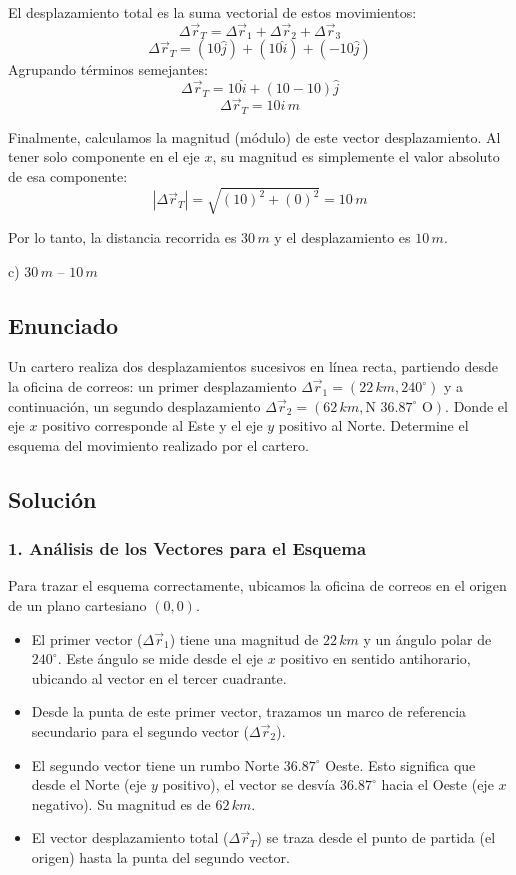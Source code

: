 \documentclass[12pt, a4paper]{article}
\begin{document}
El desplazamiento total es la suma vectorial de estos movimientos:
$$\Delta\vec{r}_T = \Delta\vec{r}_1 + \Delta\vec{r}_2 + \Delta\vec{r}_3$$
$$\Delta\vec{r}_T = (10\hat{j}) + (10\hat{i}) + (-10\hat{j})$$
Agrupando términos semejantes:
$$\Delta\vec{r}_T = 10\hat{i} + (10 - 10)\hat{j}$$
$$\Delta\vec{r}_T = 10\hat{i} \, \si{m}$$

Finalmente, calculamos la magnitud (módulo) de este vector desplazamiento. Al tener solo componente en el eje $x$, su magnitud es simplemente el valor absoluto de esa componente:
$$|\Delta\vec{r}_T| = \sqrt{(10)^2 + (0)^2} = 10 \, \si{m}$$

Por lo tanto, la distancia recorrida es $30 \, \si{m}$ y el desplazamiento es $10 \, \si{m}$.

\begin{tcolorbox}[colback=green!5!white, colframe=green!50!black, title=Respuesta Final]
\centering \Large c) $30 \, \si{m}$ -- $10 \, \si{m}$
\end{tcolorbox}

\newpage

\subsection*{Enunciado}
Un cartero realiza dos desplazamientos sucesivos en línea recta, partiendo desde la oficina de correos: un primer desplazamiento $\Delta\vec{r}_1 = (22 \, \si{km}, 240^\circ)$ y a continuación, un segundo desplazamiento $\Delta\vec{r}_2 = (62 \, \si{km}, \text{N } 36.87^\circ \text{ O})$. Donde el eje $x$ positivo corresponde al Este y el eje $y$ positivo al Norte. Determine el esquema del movimiento realizado por el cartero.

\subsection*{Solución}

\subsubsection*{1. Análisis de los Vectores para el Esquema}
Para trazar el esquema correctamente, ubicamos la oficina de correos en el origen de un plano cartesiano $(0,0)$. 
\begin{itemize}
    \item El primer vector ($\Delta\vec{r}_1$) tiene una magnitud de $22 \, \si{km}$ y un ángulo polar de $240^\circ$. Este ángulo se mide desde el eje $x$ positivo en sentido antihorario, ubicando al vector en el tercer cuadrante.
    \item Desde la punta de este primer vector, trazamos un marco de referencia secundario para el segundo vector ($\Delta\vec{r}_2$).
    \item El segundo vector tiene un rumbo Norte $36.87^\circ$ Oeste. Esto significa que desde el Norte (eje $y$ positivo), el vector se desvía $36.87^\circ$ hacia el Oeste (eje $x$ negativo). Su magnitud es de $62 \, \si{km}$.
    \item El vector desplazamiento total ($\Delta\vec{r}_T$) se traza desde el punto de partida (el origen) hasta la punta del segundo vector.
\end{itemize}
\end{document}
